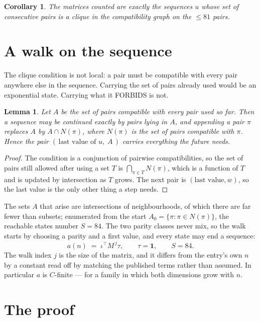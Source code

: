 \documentclass[11pt,a4paper]{article}
\theoremstyle{plain}
\newtheorem{lemma}[theorem]{Lemma}
\newtheorem{corollary}[theorem]{Corollary}
\theoremstyle{definition}
\begin{document}
\begin{corollary}
The matrices counted are exactly the sequences $u$ whose set of consecutive pairs is a clique in
the compatibility graph on the $\le 81$ pairs.
\end{corollary}

\section{A walk on the sequence}

The clique condition is not local: a pair must be compatible with every pair anywhere else in
the sequence. Carrying the set of pairs already used would be an exponential state. Carrying
what it FORBIDS is not.

\begin{lemma}\label{lem:lump}
Let $A$ be the set of pairs compatible with every pair used so far. Then a sequence may be
continued exactly by pairs lying in $A$, and appending a pair $\pi$ replaces $A$ by
$A\cap N(\pi)$, where $N(\pi)$ is the set of pairs compatible with $\pi$. Hence the pair
$(\,\text{last value of }u,\;A\,)$ carries everything the future needs.
\end{lemma}

\begin{proof}
The condition is a conjunction of pairwise compatibilities, so the set of pairs still allowed
after using a set $T$ is $\bigcap_{\pi\in T}N(\pi)$, which is a function of $T$ and is updated
by intersection as $T$ grows. The next pair is $(\text{last value},w)$, so the last value is
the only other thing a step needs.
\end{proof}

The sets $A$ that arise are intersections of neighbourhoods, of which there are far fewer than
subsets; enumerated from the start $A_0=\{\pi:\pi\in N(\pi)\}$, the reachable states number
$S=84$. The two parity classes never mix, so the walk starts by choosing a parity and a first
value, and every state may end a sequence:
\[
a(n)\;=\;\iota^{\!\top}M^{\,j}\tau ,\qquad \tau=\mathbf{1},\qquad S=84.
\]
The walk index $j$ is the size of the matrix, and it differs from the entry's own $n$ by a
constant read off by matching the published terms rather than assumed. In particular $a$ is
$C$-finite --- for a family in which both dimensions grow with $n$.

\section{The proof}
\end{document}
